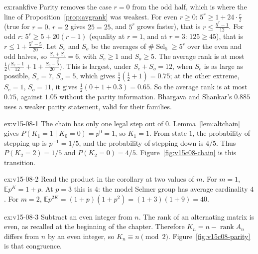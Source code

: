 \begin{solution}{ex:rankfive}
\idea Parity removes the case $r=0$ from the odd half, which is where the line of Proposition~\ref{prop:avgrank} was weakest.
\writeup For even $r\ge0$: $5^r\ge1+24\cdot\frac r2$ (true for $r=0$, $r=2$ gives $25=25$, and $5^r$ grows faster), that is $r\le\frac{5^r-1}{12}$. For odd $r$: $5^r\ge5+20(r-1)$ (equality at $r=1$, and at $r=3$: $125\ge45$), that is $r\le1+\frac{5^r-5}{20}$. Let $S_e$ and $S_o$ be the averages of $\#\operatorname{Sel}_5\ge5^r$ over the even and odd halves, so $\frac{S_e+S_o}2=6$, with $S_e\ge1$ and $S_o\ge5$. The average rank is at most $\frac12\bigl(\frac{S_e-1}{12}+1+\frac{S_o-5}{20}\bigr)$. This is largest, under $S_e+S_o=12$, when $S_e$ is as large as possible, $S_e=7$, $S_o=5$, which gives $\frac12(\frac12+1)=0.75$; at the other extreme, $S_e=1$, $S_o=11$, it gives $\frac12(0+1+0.3)=0.65$. So the average rank is at most $0.75$, against $1.05$ without the parity information. Bhargava and Shankar's $0.885$ uses a weaker parity statement, valid for their families.
\end{solution}

\begin{solution}{ex:v15-08-1}
\idea The chain has only one legal step out of \(0\).
\writeup Lemma~\ref{lem:altchain} gives \(P(K_1=1\mid K_0=0)=p^{0}=1\), so \(K_1=1\). From state \(1\), the probability of stepping up is \(p^{-1}=1/5\), and the probability of stepping down is \(4/5\). Thus \(P(K_2=2)=1/5\) and \(P(K_2=0)=4/5\). Figure~\ref{fig:v15c08-chain} is this transition.
\end{solution}

\begin{solution}{ex:v15-08-2}
\idea Read the product in the corollary at two values of \(m\).
\writeup For \(m=1\), \(\mathbb Ep^{K}=1+p\). At \(p=3\) this is \(4\): the model Selmer group has average cardinality \(4\). For \(m=2\), \(\mathbb Ep^{2K}=(1+p)(1+p^2)=(1+3)(1+9)=40\).
\end{solution}

\begin{solution}{ex:v15-08-3}
\idea Subtract an even integer from \(n\).
\writeup The rank of an alternating matrix is even, as recalled at the beginning of the chapter. Therefore \(K_n=n-\operatorname{rank}A_n\) differs from \(n\) by an even integer, so \(K_n\equiv n\pmod2\). Figure~\ref{fig:v15c08-parity} is that congruence.
\end{solution}


